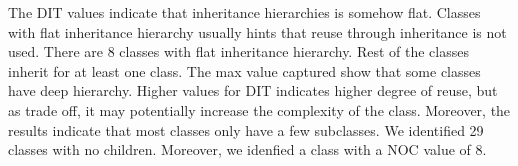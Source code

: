 \begin{table}[]
\end{table}

The DIT values indicate that inheritance hierarchies is somehow flat. Classes with flat inheritance hierarchy usually hints that reuse through inheritance is not used. There are 8 classes with flat inheritance hierarchy. Rest of the classes inherit for at least one class. The max value captured show that some classes have deep hierarchy. Higher values for DIT indicates higher degree of reuse, but as trade off, it may potentially increase the complexity of the class. Moreover, the results indicate that most classes only have a few subclasses. We identified 29 classes with no children. Moreover, we idenfied a class with a NOC value of 8. 

